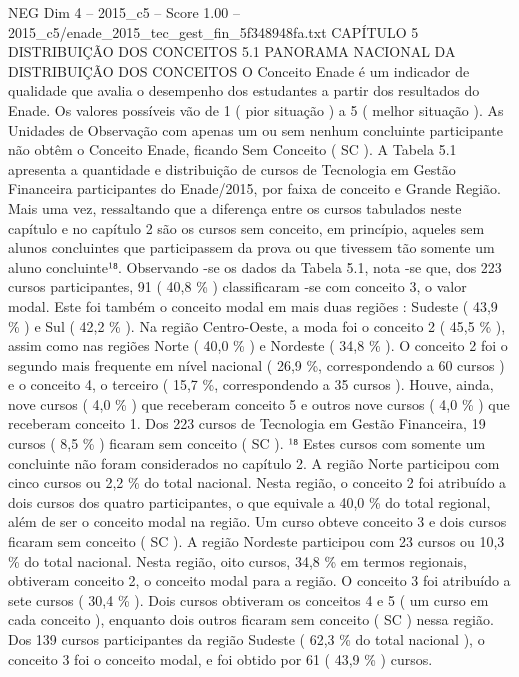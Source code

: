 \begin{textsample}{NEG Dim 4 – 2015\_c5 – Score 1.00 – 2015\_c5/enade\_2015\_tec\_gest\_fin\_5f348948fa.txt}  \label{ex:f4_neg_180}
CAPÍTULO 5 DISTRIBUIÇÃO DOS CONCEITOS 5.1 PANORAMA NACIONAL DA DISTRIBUIÇÃO DOS CONCEITOS O Conceito Enade é um indicador de qualidade que avalia o desempenho dos estudantes a partir dos resultados do Enade.
Os valores possíveis vão de 1 ( pior situação ) a 5 ( melhor situação ).
As Unidades de Observação com apenas um ou sem nenhum concluinte participante não obtêm o Conceito Enade, ficando Sem Conceito ( SC ).
A Tabela 5.1 apresenta a quantidade e distribuição de cursos de Tecnologia em Gestão Financeira participantes do Enade/2015, por faixa de conceito e Grande Região.
Mais uma vez, ressaltando que a diferença entre os cursos tabulados neste capítulo e no capítulo 2 são os cursos sem conceito, em princípio, aqueles sem alunos concluintes que participassem da prova ou que tivessem tão somente um aluno concluinte¹⁸.
Observando -se os dados da Tabela 5.1, nota -se que, dos 223 cursos participantes, 91 ( 40,8 \% ) classificaram -se com conceito 3, o valor modal.
Este foi também o conceito modal em mais duas regiões : Sudeste ( 43,9 \% ) e Sul ( 42,2 \% ).
Na região Centro-Oeste, a moda foi o conceito 2 ( 45,5 \% ), assim como nas regiões Norte ( 40,0 \% ) e Nordeste ( 34,8 \% ).
O conceito 2 foi o segundo mais frequente em nível nacional ( 26,9 \%, correspondendo a 60 cursos ) e o conceito 4, o terceiro ( 15,7 \%, correspondendo a 35 cursos ).
Houve, ainda, nove cursos ( 4,0 \% ) que receberam conceito 5 e outros nove cursos ( 4,0 \% ) que receberam conceito 1.
Dos 223 cursos de Tecnologia em Gestão Financeira, 19 cursos ( 8,5 \% ) ficaram sem conceito ( SC ). ¹⁸ Estes cursos com somente um concluinte não foram considerados no capítulo 2.
A região Norte participou com cinco cursos ou 2,2 \% do total nacional.
Nesta região, o conceito 2 foi atribuído a dois cursos dos quatro participantes, o que equivale a 40,0 \% do total regional, além de ser o conceito modal na região.
Um curso obteve conceito 3 e dois cursos ficaram sem conceito ( SC ).
A região Nordeste participou com 23 cursos ou 10,3 \% do total nacional.
Nesta região, oito cursos, 34,8 \% em termos regionais, obtiveram conceito 2, o conceito modal para a região.
O conceito 3 foi atribuído a sete cursos ( 30,4 \% ).
Dois cursos obtiveram os conceitos 4 e 5 ( um curso em cada conceito ), enquanto dois outros ficaram sem conceito ( SC ) nessa região.
Dos 139 cursos participantes da região Sudeste ( 62,3 \% do total nacional ), o conceito 3 foi o conceito modal, e foi obtido por 61 ( 43,9 \% ) cursos.

\end{textsample}
